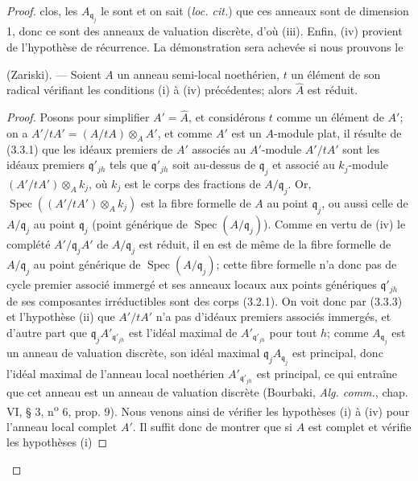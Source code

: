 \begin{proof}

clos, les $A_{\mathfrak q_j}$ le sont et on sait (\emph{loc. cit.}) que ces
anneaux sont de dimension 1, donc ce sont des anneaux de valuation discrète,
d'où (iii). Enfin, (iv) provient de l'hypothèse de récurrence. La démonstration
sera achevée si nous prouvons le

\begin{lemma}[7.6.4.1]
\label{IV.2.s7.6.4.1-fr}
(Zariski). --- Soient $A$ un anneau semi-local noethérien, $t$ un élément de
son radical vérifiant les conditions (i) à (iv) précédentes; alors
$\widehat A$ est réduit.
\end{lemma}

\begin{proof}
Posons pour simplifier $A'=\widehat A$, et considérons $t$ comme un élément de
$A'$; on a $A'/tA'=(A/tA)\otimes_AA'$, et comme $A'$ est un $A$-module plat,
il résulte de (3.3.1) que les idéaux premiers de $A'$ associés au $A'$-module
$A'/tA'$ sont les idéaux premiers $\mathfrak q'_{jh}$ tels que
$\mathfrak q'_{jh}$ soit au-dessus de $\mathfrak q_j$ et associé au
$k_j$-module $(A'/tA')\otimes_Ak_j$, où $k_j$ est le corps des fractions de
$A/\mathfrak q_j$. Or,
$\operatorname{Spec}((A'/tA')\otimes_Ak_j)$ est la fibre formelle de $A$ au
point $\mathfrak q_j$, ou aussi celle de $A/\mathfrak q_j$ au point
$\mathfrak q_j$ (point générique de
$\operatorname{Spec}(A/\mathfrak q_j)$). Comme en vertu de (iv) le complété
$A'/\mathfrak q_jA'$ de $A/\mathfrak q_j$ est réduit, il en est de même de la
fibre formelle de $A/\mathfrak q_j$ au point générique de
$\operatorname{Spec}(A/\mathfrak q_j)$; cette fibre formelle n'a donc pas de
cycle premier associé immergé et ses anneaux locaux aux points génériques
$\mathfrak q'_{jh}$ de ses composantes irréductibles sont des corps (3.2.1).
On voit donc par (3.3.3) et l'hypothèse (ii) que $A'/tA'$ n'a pas d'idéaux
premiers associés immergés, et d'autre part que
$\mathfrak q_jA'_{\mathfrak q'_{jh}}$ est l'idéal maximal de
$A'_{\mathfrak q'_{jh}}$ pour tout $h$; comme $A_{\mathfrak q_j}$ est un
anneau de valuation discrète, son idéal maximal
$\mathfrak q_jA_{\mathfrak q_j}$ est principal, donc l'idéal maximal de
l'anneau local noethérien $A'_{\mathfrak q'_{jh}}$ est principal, ce qui
entraîne que cet anneau est un anneau de valuation discrète (Bourbaki,
\emph{Alg. comm.}, chap. VI, § 3, n\textsuperscript{o} 6, prop. 9). Nous venons
ainsi de vérifier les hypothèses (i) à (iv) pour l'anneau local complet $A'$.
Il suffit donc de montrer que si $A$ est complet et vérifie les hypothèses (i)

\end{proof}
\end{proof}
